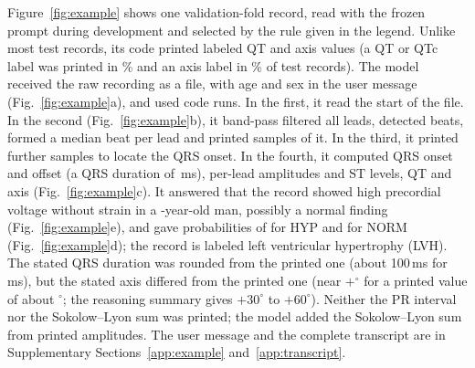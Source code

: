 Figure~\ref{fig:example} shows one validation-fold record, read with the frozen prompt during development and
selected by the rule given in the legend. Unlike most test records, its code printed labeled QT and axis values
(a QT or QTc label was printed in \PHPrintedQtcPct\% and an axis label in \PHPrintedAxisPct\% of test records). The model received the raw recording as a file, with age and sex in the user message
(Fig.~\ref{fig:example}a), and used \ExampleCodeRuns{} code runs. In the first, it read the start of the file. In the
second (Fig.~\ref{fig:example}b), it band-pass filtered all leads, detected beats, formed a median beat per lead and
printed samples of it. In the third, it printed further samples to locate the QRS onset. In the fourth, it computed QRS
onset and offset (a QRS duration of \ExampleQRSPrinted\,ms), per-lead amplitudes and ST levels, QT and axis
(Fig.~\ref{fig:example}c). It answered that the record showed high precordial voltage without strain in a
\ExampleAge-year-old man, possibly a normal finding (Fig.~\ref{fig:example}e), and gave probabilities of
\ExamplePHYP{} for HYP and \ExamplePNORM{} for NORM (Fig.~\ref{fig:example}d); the record is labeled left
ventricular hypertrophy (LVH). The stated QRS duration was rounded from the printed one (about 100\,ms for
\ExampleQRSPrinted\,ms), but the stated axis differed from the printed one (near $+$\ExampleAxisStated$^\circ$ for a
printed value of about \ExampleAxisPrinted$^\circ$; the reasoning summary gives $+30^\circ$ to $+60^\circ$). Neither the
PR interval nor the Sokolow--Lyon sum was printed; the model added the Sokolow--Lyon sum from printed amplitudes. The user message and the
complete transcript are in Supplementary Sections~\ref{app:example} and~\ref{app:transcript}.

